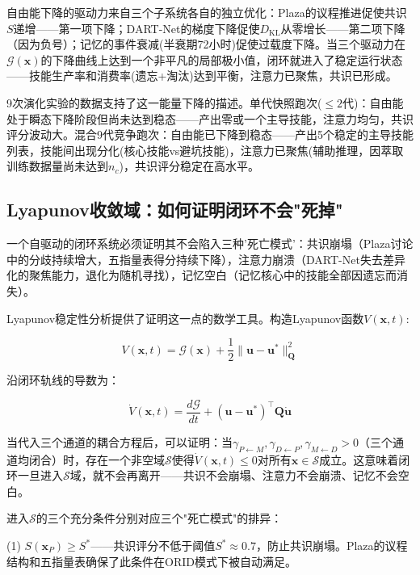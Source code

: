 \documentclass[twocolumn,10.5pt]{ctexart}
\def\cG{\mathcal{G}}
\begin{document}
自由能下降的驱动力来自三个子系统各自的独立优化：Plaza的议程推进促使共识$S$递增——第一项下降；DART-Net的梯度下降促使$D_{\text{KL}}$从零增长——第二项下降（因为负号）；记忆的事件衰减(半衰期72小时)促使过载度下降。当三个驱动力在$\cG(\mathbf{x})$的下降曲线上达到一个非平凡的局部极小值，闭环就进入了稳定运行状态——技能生产率和消费率(遗忘+淘汰)达到平衡，注意力已聚焦，共识已形成。

9次演化实验的数据支持了这一能量下降的描述。单代快照跑次($\leq 2$代)：自由能处于瞬态下降阶段但尚未达到稳态——产出零或一个主导技能，注意力均匀，共识评分波动大。混合9代竞争跑次：自由能已下降到稳态——产出5个稳定的主导技能列表，技能间出现分化(核心技能vs避坑技能)，注意力已聚焦(辅助推理，因萃取训练数据量尚未达到$n_c$)，共识评分稳定在高水平。

\subsection{Lyapunov收敛域：如何证明闭环不会"死掉"}

一个自驱动的闭环系统必须证明其不会陷入三种'死亡模式'：共识崩塌（Plaza讨论中的分歧持续增大，五指量表得分持续下降），注意力崩溃（DART-Net失去差异化的聚焦能力，退化为随机寻找），记忆空白（记忆核心中的技能全部因遗忘而消失）。

Lyapunov稳定性分析提供了证明这一点的数学工具。构造Lyapunov函数$V(\mathbf{x}, t)$:

\begin{equation}
V(\mathbf{x}, t) = \cG(\mathbf{x}) + \frac{1}{2}\|\mathbf{u} - \mathbf{u}^*\|^2_{\mathbf{Q}}
\label{eq:lyapunov}
\end{equation}

沿闭环轨线的导数为：

\begin{equation}
\dot{V}(\mathbf{x}, t) = \frac{d\cG}{dt} + (\mathbf{u} - \mathbf{u}^*)^\top \mathbf{Q} \dot{\mathbf{u}}
\label{eq:V_dot}
\end{equation}

当代入三个通道的耦合方程后，可以证明：当$\gamma_{P\leftarrow M}, \gamma_{D\leftarrow P}, \gamma_{M\leftarrow D} > 0$（三个通道均闭合）时，存在一个非空域$\mathcal{S}$使得$\dot{V}(\mathbf{x}, t) \leq 0$对所有$\mathbf{x} \in \mathcal{S}$成立。这意味着闭环一旦进入$\mathcal{S}$域，就不会再离开——共识不会崩塌、注意力不会崩溃、记忆不会空白。

进入$\mathcal{S}$的三个充分条件分别对应三个"死亡模式"的排异：

(1) $S(\mathbf{x}_P) \geq S^*$——共识评分不低于阈值$S^* \approx 0.7$，防止共识崩塌。Plaza的议程结构和五指量表确保了此条件在ORID模式下被自动满足。
\end{document}
